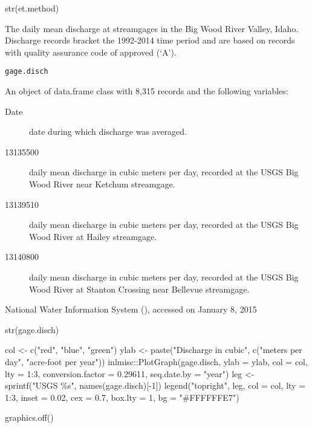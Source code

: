 \documentclass[a4paper]{book}
\begin{document}
%
\begin{Examples}
\begin{ExampleCode}
str(et.method)

\end{ExampleCode}
\end{Examples}
%
\begin{Description}\relax
The daily mean discharge at streamgages in the Big Wood River Valley, Idaho.
Discharge records bracket the 1992-2014 time period and are based on
records with quality assurance code of approved (`A').
\end{Description}
%
\begin{Usage}
\begin{verbatim}
gage.disch
\end{verbatim}
\end{Usage}
%
\begin{Format}
An object of data.frame class with 8,315 records and the following variables:
\begin{description}

\item[Date] date during which discharge was averaged.
\item[13135500] daily mean discharge in cubic meters per day, recorded at the USGS
Big Wood River near Ketchum streamgage.
\item[13139510] daily mean discharge in cubic meters per day, recorded at the USGS
Big Wood River at Hailey streamgage.
\item[13140800] daily mean discharge in cubic meters per day, recorded at the USGS
Big Wood River at Stanton Crossing near Bellevue streamgage.

\end{description}
\end{Format}
%
\begin{Source}\relax
National Water Information System (),
accessed on January 8, 2015
\end{Source}
%
\begin{Examples}
\begin{ExampleCode}
str(gage.disch)

col <- c("red", "blue", "green")
ylab <- paste("Discharge in cubic", c("meters per day", "acre-foot per year"))
inlmisc::PlotGraph(gage.disch, ylab = ylab, col = col, lty = 1:3,
                   conversion.factor = 0.29611, seq.date.by = "year")
leg <- sprintf("USGS \%s", names(gage.disch)[-1])
legend("topright", leg, col = col, lty = 1:3, inset = 0.02, cex = 0.7,
       box.lty = 1, bg = "#FFFFFFE7")

graphics.off()

\end{ExampleCode}
\end{Examples}
\end{document}

